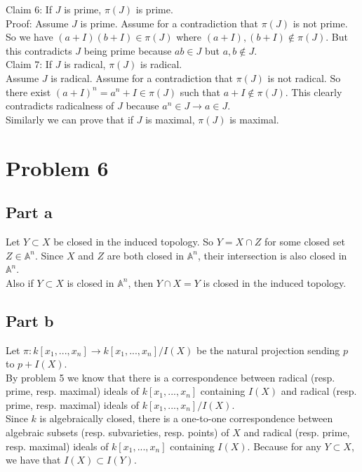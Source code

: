\documentclass[12pt]{article}
\begin{document}
Claim 6: If $J$ is prime, $\pi(J)$ is prime. \\
Proof:
Assume $J$ is prime. Assume for a contradiction that $\pi(J)$ is not prime. So we have
$(a+I)(b+I) \in \pi(J)$ where $(a+I),(b+I) \not\in \pi(J)$. But this contradicts $J$ being prime because $ab \in J$ but $a,b \not\in J$. \\
Claim 7: If $J$ is radical, $\pi(J)$ is radical. \\
Assume $J$ is radical. Assume for a contradiction that $\pi(J)$ is not radical. So there exist
$(a+I)^n =a^n+I \in \pi(J)$ such that $a+I \not\in \pi(J)$. This clearly contradicts radicalness of $J$ because $a^n \in J \rightarrow a \in J$.
\\
Similarly we can prove that if $J$ is maximal, $\pi(J)$ is maximal.






\clearpage
\section*{Problem 6}
\subsection*{Part a}
Let $Y \subset X$ be closed in the induced topology.
So $Y=X \cap Z$ for some closed set $Z \in \mathbb{A}^n$. Since $X$ and $Z$ are both closed in $\mathbb{A}^n$, their intersection is also closed in $\mathbb{A}^n$. \\
Also if $Y \subset X$ is closed in $\mathbb{A}^n$, then $Y \cap X=Y$ is closed in the induced topology.
\subsection*{Part b}
Let $\pi : k[x_1,...,x_n] \rightarrow k[x_1,...,x_n]/I(X)$ be the natural projection sending $p$ to $p+I(X)$. \\
By problem 5 we know that there is a correspondence between radical (resp. prime, resp. maximal) ideals of $k[x_1,...,x_n]$ containing $I(X)$ and radical (resp. prime, resp. maximal) ideals of $k[x_1,...,x_n]/I(X)$. \\
Since $k$ is algebraically closed, there is a one-to-one correspondence between algebraic subsets (resp. subvarieties, resp. points) of $X$ and 
radical (resp. prime, resp. maximal) ideals of $k[x_1,...,x_n]$ containing $I(X)$. Because for any $Y \subset X$, we have that $I(X) \subset I(Y)$.
\end{document}
